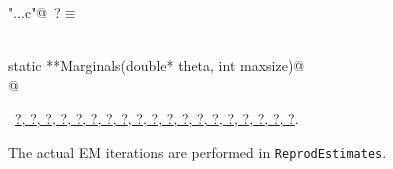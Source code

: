 \documentclass[reqno]{amsart}
\renewcommand{\NWtarget}[2]{\hypertarget{#1}{#2}}
\renewcommand{\NWlink}[2]{\hyperlink{#1}{#2}}
\begin{document}
\begin{flushleft} \small\label{scrap2}\raggedright\small
\NWtarget{nuweb?}{} \verb@"..\src\ReprodCalcs.c"@\nobreak\ {\footnotesize {?}}$\equiv$
\vspace{-1ex}
\begin{list}{}{} \item
\mbox{}\verb@@\\
\mbox{}\verb@double static **Marginals(double* theta, int maxsize)@\\
\mbox{}@\\
\mbox{}\verb@@{\NWsep}
\end{list}
\vspace{-1.5ex}
\footnotesize
\begin{list}{}{\setlength{\itemsep}{-\parsep}\setlength{\itemindent}{-\leftmargin}}
\item \NWtxtFileDefBy\ \NWlink{nuweb?}{?}\NWlink{nuweb?}{, ?}\NWlink{nuweb?}{, ?}\NWlink{nuweb?}{, ?}\NWlink{nuweb?}{, ?}\NWlink{nuweb?}{, ?}\NWlink{nuweb?}{, ?}\NWlink{nuweb?}{, ?}\NWlink{nuweb?}{, ?}\NWlink{nuweb?}{, ?}\NWlink{nuweb?}{, ?}\NWlink{nuweb?}{, ?}\NWlink{nuweb?}{, ?}\NWlink{nuweb?}{, ?}\NWlink{nuweb?}{, ?}\NWlink{nuweb?}{, ?}\NWlink{nuweb?}{, ?}\NWlink{nuweb?}{, ?}\NWlink{nuweb?}{, ?}.

\item{}
\end{list}
\vspace{4ex}
\end{flushleft}
The actual EM iterations are performed in \texttt{ReprodEstimates}.
\end{document}
